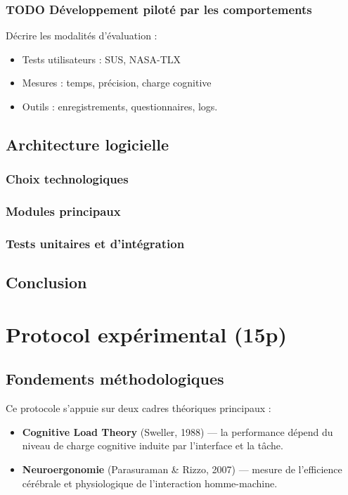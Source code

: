 \documentclass[a4paper,12pt]{article}
\begin{document}
\subsubsection{{\bfseries\sffamily TODO} Développement piloté par les comportements}
\label{sec:org1917700}
Décrire les modalités d’évaluation :  
\begin{itemize}
\item Tests utilisateurs : SUS, NASA-TLX
\item Mesures : temps, précision, charge cognitive
\item Outils : enregistrements, questionnaires, logs.
\end{itemize}
\subsection{Architecture logicielle}
\label{sec:orga880ac0}
\subsubsection{Choix technologiques}
\label{sec:orge734e58}
\subsubsection{Modules principaux}
\label{sec:org3517ccd}
\subsubsection{Tests unitaires et d'intégration}
\label{sec:org44d24b0}
\subsection{Conclusion}
\label{sec:orgfd31bba}
\clearpage
\section{Protocol expérimental (15p)}
\label{sec:orgf729861}
\subsection{Fondements méthodologiques}
\label{sec:org6a891ba}
Ce protocole s’appuie sur deux cadres théoriques principaux :
\begin{itemize}
\item \textbf{Cognitive Load Theory} (Sweller, 1988) — la performance dépend du niveau de charge cognitive induite par l’interface et la tâche.
\item \textbf{Neuroergonomie} (Parasuraman \& Rizzo, 2007) — mesure de l’efficience cérébrale et physiologique de l’interaction homme-machine.
\end{itemize}
\end{document}
